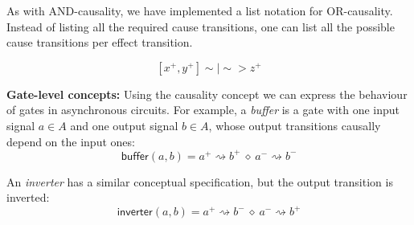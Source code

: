 \documentclass[british, journal]{IEEEtran}
\begin{document}
As with AND-causality, we have implemented a list notation for OR-causality. Instead of listing
all the required cause transitions, one can list all the possible cause transitions per effect transition.

\vspace{-3mm}

\[
[x^{+}, y^{+}]\sim|\sim>z^{+}
\]

\textbf{Gate-level concepts:} Using the causality concept we can express
the behaviour of gates in asynchronous circuits. For example, a \emph{buffer}
is a gate with one input signal $a\in A$ and one output signal $b\in A$,
whose output transitions causally depend on the input ones:
\[
\mathsf{buffer}(a, b)=a^{+}\rightsquigarrow b^{+}\ \diamond\
a^{-}\rightsquigarrow b^{-}
\]

\noindent An \emph{inverter} has a similar conceptual specification, but the
output transition is inverted:
\[
\mathsf{inverter}(a, b)=a^{+}\rightsquigarrow b^{-}\ \diamond\
a^{-}\rightsquigarrow b^{+}
\]

\end{document}
